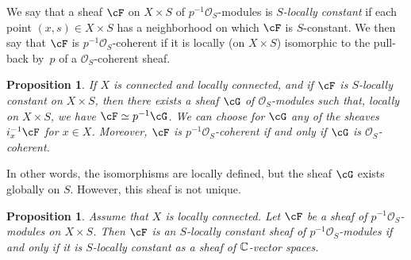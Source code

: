 \documentclass[english]{smfart}
\numberwithin{subsection}{section}
\def\sho{\mathcal{O}}\let\cO\sho
\newcommand{\XS}{X\times S}
\newcommand{\pOS}{p^{-1}\sho_S}
\numberwithin{equation}{section}
\theoremstyle{plain}
\newtheorem{proposition}[equation]{Proposition}
\theoremstyle{definition}
\def\to{\mathchoice{\longrightarrow}{\rightarrow}{\rightarrow}{\rightarrow}}
\begin{document}
\begin{comment}
\subsection{$S$-locally constant sheaves}
\end{comment}
We say that a sheaf $\cF$ on $\XS$ of $\pOS$-modules is \emph{$S$-locally constant} if each point $(x,s)\in \XS$ has a neighborhood on which $\cF$ is $S$-constant. We then say that $\cF$ is $\pOS$-coherent if it is locally (on $\XS$) isomorphic to the pull-back by~$p$ of a $\sho_S$-coherent sheaf.

\begin{proposition}\label{prop:cG}
If $X$ is connected and locally connected, and if $\cF$ is $S$-locally constant on $\XS$, then there exists a sheaf $\cG$ of $\sho_S$-modules such that, locally on $\XS$, we have $\cF\simeq p^{-1}\cG$. We can choose for $\cG$ any of the sheaves $i_x^{-1}\cF$ for $x\in X$. Moreover, $\cF$ is $\pOS$-coherent if and only if $\cG$ is $\sho_S$-coherent.
\end{proposition}

In other words, the isomorphisms are locally defined, but the sheaf $\cG$ exists globally on $S$. However, this sheaf is not unique.

\begin{comment}
\begin{proof}
For $x_o\in X$, let us set $\cG^{(x_o)}=i_{x_o}^{-1}\cF$. If $U$ is a connected neighborhood of~$x_o$ and $V$ is a neighborhood of $s_o$ such that $\cF_{|U\times V}\simeq p_U^{-1}\cG_V$ for some sheaf~$\cG_V$, we have $\cG_V\simeq p_{U_*}\cF_{|U\times V}\simeq i_{x_o}^{-1}\cF_{|U\times V}=\cG^{(x_o)}{}_{|V}$, according to the previous proposition. Then the set of $x$ for which $\cG^{(x)}$ is locally isomorphic to $\cG^{(x_o)}$ is open and closed in $X$, hence equal to $X$ since nonempty.
\end{proof}
\end{comment}

\begin{proposition}
Assume that $X$ is locally connected. Let $\cF$ be a sheaf of $\pOS$-modules on $\XS$. Then $\cF$ is an $S$-locally constant sheaf of $\pOS$-modules if and only if it is $S$-locally constant as a sheaf of $\mathbb{C}$-vector spaces.
\end{proposition}

\begin{comment}
\begin{proof}
This is a local question, and one can assume that $\cF\simeq p^{-1}\cG$, where $\cG$ is a sheaf $\CC$-vector spaces. Let us consider the adjunction morphism $p^{-1}p_*\cF\to\nobreak\cF$. Since $X$ is locally connected, we can assume in the local setting that $X$ is connected. Then $\cG\to p_*p^{-1}\cG$ is an isomorphism of sheaves of $\CC$-vector spaces, and thus so is $p^{-1}p_*\cF\to\cF$. This morphism being a morphism in the category of $\pOS$-modules, it is also an isomorphism in this category.
\end{proof}
\end{comment}
\end{document}
